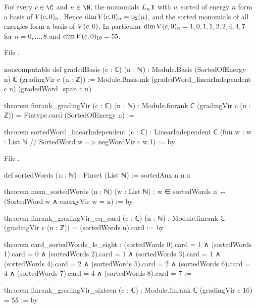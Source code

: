 \begin{theorem}\label{l06:thm:pbw}
For every $c\in\C$ and $n\in\N$, the monomials $L_w\mathbf{1}$ with $w$ sorted of energy $n$ form a
basis of $V(c,0)_n$. Hence $\dim V(c,0)_n = \mathrm{p}_{2}(n)$, and the sorted monomials of all energies form a
basis of $V(c,0)$. In particular $\dim V(c,0)_n = 1,0,1,1,2,2,4,4,7$ for $n = 0,\dots,8$ and
$\dim V(c,0)_{16} = 55$.
\end{theorem}

File .
\begin{leancode}
noncomputable def gradedBasis (c : ℂ) (n : ℕ) : Module.Basis (SortedOfEnergy n) ℂ
    (gradingVir c (n : ℤ)) :=
  Module.Basis.mk (gradedWord_linearIndependent c n) (gradedWord_span c n)

theorem finrank_gradingVir (c : ℂ) (n : ℕ) :
    Module.finrank ℂ (gradingVir c (n : ℤ)) = Fintype.card (SortedOfEnergy n) :=

theorem sortedWord_linearIndependent (c : ℂ) :
    LinearIndependent ℂ (fun w : {w : List ℕ // SortedWord w} => negWordVir c w.1) := by
\end{leancode}
File .
\begin{leancode}
def sortedWords (n : ℕ) : Finset (List ℕ) := sortedAux n n n

theorem mem_sortedWords (n : ℕ) (w : List ℕ) :
    w ∈ sortedWords n ↔ (SortedWord w ∧ energyVir w = n) := by

theorem finrank_gradingVir_eq_card (c : ℂ) (n : ℕ) :
    Module.finrank ℂ (gradingVir c (n : ℤ)) = (sortedWords n).card := by

theorem card_sortedWords_le_eight :
    (sortedWords 0).card = 1 ∧ (sortedWords 1).card = 0 ∧ (sortedWords 2).card = 1 ∧
      (sortedWords 3).card = 1 ∧ (sortedWords 4).card = 2 ∧ (sortedWords 5).card = 2 ∧
      (sortedWords 6).card = 4 ∧ (sortedWords 7).card = 4 ∧ (sortedWords 8).card = 7 :=

theorem finrank_gradingVir_sixteen (c : ℂ) : Module.finrank ℂ (gradingVir c 16) = 55 := by
\end{leancode}

